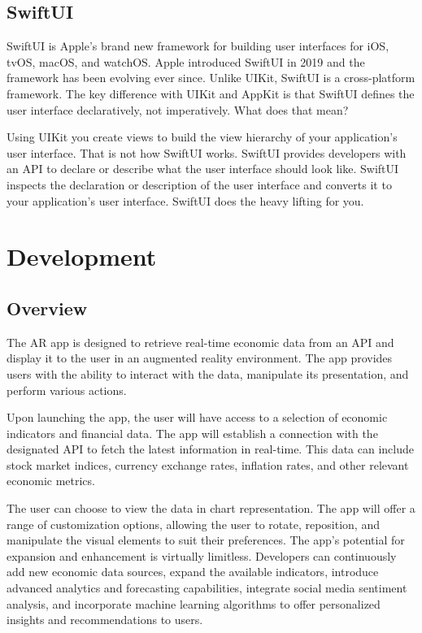\documentclass[a4paper,oneside]{article}
\begin{document}
\subsection{SwiftUI}

SwiftUI is Apple's brand new framework for building user interfaces for iOS, tvOS, macOS, and watchOS. Apple introduced SwiftUI in 2019 and the framework has been evolving ever since. Unlike UIKit, SwiftUI is a cross-platform framework. The key difference with UIKit and AppKit is that SwiftUI defines the user interface declaratively, not imperatively. What does that mean?

Using UIKit you create views to build the view hierarchy of your application's user interface. That is not how SwiftUI works. SwiftUI provides developers with an API to declare or describe what the user interface should look like. SwiftUI inspects the declaration or description of the user interface and converts it to your application's user interface. SwiftUI does the heavy lifting for you.



\section{Development}

\subsection{Overview}

The AR app is designed to retrieve real-time economic data from an API and display it to the user in an augmented reality environment. The app provides users with the ability to interact with the data, manipulate its presentation, and perform various actions.

Upon launching the app, the user will have access to a selection of economic indicators and financial data. The app will establish a connection with the designated API to fetch the latest information in real-time.
This data can include stock market indices, currency exchange rates, inflation rates, and other relevant economic metrics.

The user can choose to view the data in chart representation.
The app will offer a range of customization options, allowing the user to rotate, reposition, and manipulate the visual elements to suit their preferences.
The app's potential for expansion and enhancement is virtually limitless. Developers can continuously add new economic data sources, expand the available indicators, introduce advanced analytics and forecasting capabilities, integrate social media sentiment analysis, and incorporate machine learning algorithms to offer personalized insights and recommendations to users.
\end{document}
